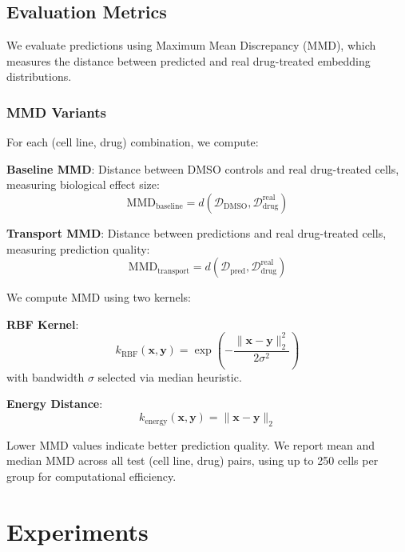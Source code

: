 \documentclass[conference]{IEEEtran}
\begin{document}
\subsection{Evaluation Metrics}

We evaluate predictions using Maximum Mean Discrepancy (MMD), which measures the distance between predicted and real drug-treated embedding distributions.

\subsubsection{MMD Variants}

For each (cell line, drug) combination, we compute:

\textbf{Baseline MMD}: Distance between DMSO controls and real drug-treated cells, measuring biological effect size:
\begin{equation}
\text{MMD}_{\text{baseline}} = d(\mathcal{D}_{\text{DMSO}}, \mathcal{D}_{\text{drug}}^{\text{real}})
\end{equation}

\textbf{Transport MMD}: Distance between predictions and real drug-treated cells, measuring prediction quality:
\begin{equation}
\text{MMD}_{\text{transport}} = d(\mathcal{D}_{\text{pred}}, \mathcal{D}_{\text{drug}}^{\text{real}})
\end{equation}

We compute MMD using two kernels:

\textbf{RBF Kernel}:
\begin{equation}
k_{\text{RBF}}(\mathbf{x}, \mathbf{y}) = \exp\left(-\frac{\|\mathbf{x} - \mathbf{y}\|_2^2}{2\sigma^2}\right)
\end{equation}
with bandwidth $\sigma$ selected via median heuristic.

\textbf{Energy Distance}:
\begin{equation}
k_{\text{energy}}(\mathbf{x}, \mathbf{y}) = \|\mathbf{x} - \mathbf{y}\|_2
\end{equation}

Lower MMD values indicate better prediction quality. We report mean and median MMD across all test (cell line, drug) pairs, using up to 250 cells per group for computational efficiency.

\section{Experiments}
\end{document}
